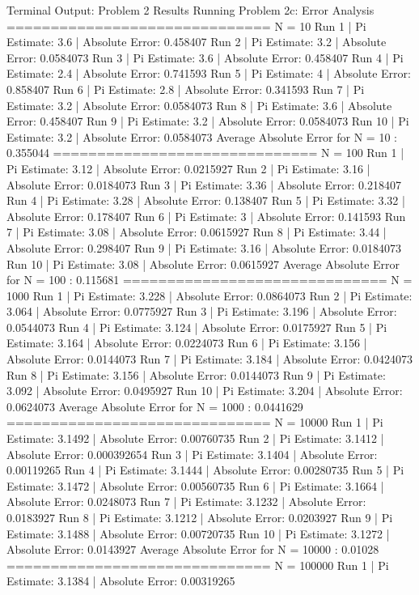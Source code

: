 \documentclass{article}
\begin{document}
\begin{outputbox}{Terminal Output: Problem 2 Results}
Running Problem 2c: Error Analysis
==============================
N = 10
Run 1 | Pi Estimate: 3.6 | Absolute Error: 0.458407
Run 2 | Pi Estimate: 3.2 | Absolute Error: 0.0584073
Run 3 | Pi Estimate: 3.6 | Absolute Error: 0.458407
Run 4 | Pi Estimate: 2.4 | Absolute Error: 0.741593
Run 5 | Pi Estimate: 4 | Absolute Error: 0.858407
Run 6 | Pi Estimate: 2.8 | Absolute Error: 0.341593
Run 7 | Pi Estimate: 3.2 | Absolute Error: 0.0584073
Run 8 | Pi Estimate: 3.6 | Absolute Error: 0.458407
Run 9 | Pi Estimate: 3.2 | Absolute Error: 0.0584073
Run 10 | Pi Estimate: 3.2 | Absolute Error: 0.0584073
Average Absolute Error for N = 10 : 0.355044
==============================
N = 100
Run 1 | Pi Estimate: 3.12 | Absolute Error: 0.0215927
Run 2 | Pi Estimate: 3.16 | Absolute Error: 0.0184073
Run 3 | Pi Estimate: 3.36 | Absolute Error: 0.218407
Run 4 | Pi Estimate: 3.28 | Absolute Error: 0.138407
Run 5 | Pi Estimate: 3.32 | Absolute Error: 0.178407
Run 6 | Pi Estimate: 3 | Absolute Error: 0.141593
Run 7 | Pi Estimate: 3.08 | Absolute Error: 0.0615927
Run 8 | Pi Estimate: 3.44 | Absolute Error: 0.298407
Run 9 | Pi Estimate: 3.16 | Absolute Error: 0.0184073
Run 10 | Pi Estimate: 3.08 | Absolute Error: 0.0615927
Average Absolute Error for N = 100 : 0.115681
==============================
N = 1000
Run 1 | Pi Estimate: 3.228 | Absolute Error: 0.0864073
Run 2 | Pi Estimate: 3.064 | Absolute Error: 0.0775927
Run 3 | Pi Estimate: 3.196 | Absolute Error: 0.0544073
Run 4 | Pi Estimate: 3.124 | Absolute Error: 0.0175927
Run 5 | Pi Estimate: 3.164 | Absolute Error: 0.0224073
Run 6 | Pi Estimate: 3.156 | Absolute Error: 0.0144073
Run 7 | Pi Estimate: 3.184 | Absolute Error: 0.0424073
Run 8 | Pi Estimate: 3.156 | Absolute Error: 0.0144073
Run 9 | Pi Estimate: 3.092 | Absolute Error: 0.0495927
Run 10 | Pi Estimate: 3.204 | Absolute Error: 0.0624073
Average Absolute Error for N = 1000 : 0.0441629
==============================
N = 10000
Run 1 | Pi Estimate: 3.1492 | Absolute Error: 0.00760735
Run 2 | Pi Estimate: 3.1412 | Absolute Error: 0.000392654
Run 3 | Pi Estimate: 3.1404 | Absolute Error: 0.00119265
Run 4 | Pi Estimate: 3.1444 | Absolute Error: 0.00280735
Run 5 | Pi Estimate: 3.1472 | Absolute Error: 0.00560735
Run 6 | Pi Estimate: 3.1664 | Absolute Error: 0.0248073
Run 7 | Pi Estimate: 3.1232 | Absolute Error: 0.0183927
Run 8 | Pi Estimate: 3.1212 | Absolute Error: 0.0203927
Run 9 | Pi Estimate: 3.1488 | Absolute Error: 0.00720735
Run 10 | Pi Estimate: 3.1272 | Absolute Error: 0.0143927
Average Absolute Error for N = 10000 : 0.01028
==============================
N = 100000
Run 1 | Pi Estimate: 3.1384 | Absolute Error: 0.00319265

\end{outputbox}
\end{document}

